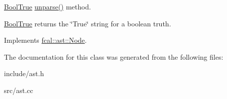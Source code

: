 \hyperlink{classfcal_1_1ast_1_1BoolTrue}{Bool\+True} \hyperlink{classfcal_1_1ast_1_1BoolTrue_a1467c30c135c099ea80f19f965bddca8}{unparse()} method. 

\hyperlink{classfcal_1_1ast_1_1BoolTrue}{Bool\+True} returns the \char`\"{}\+True\char`\"{} string for a boolean truth. 

Implements \hyperlink{classfcal_1_1ast_1_1Node_a81865f5a1df593708a39bf492952742a}{fcal\+::ast\+::\+Node}.



The documentation for this class was generated from the following files\+:\begin{DoxyCompactItemize}
\item 
include/ast.\+h\item 
src/ast.\+cc\end{DoxyCompactItemize}
